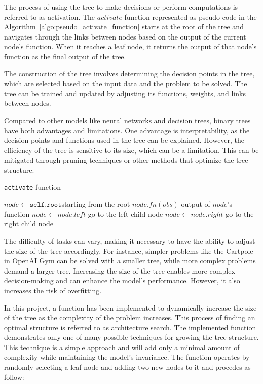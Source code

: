 The process of using the tree to make decisions or perform computations is referred to as activation. The $activate$ function represented as pseudo code in the Algorithm~\ref{algo:pseudo_activate_function} starts at the root of the tree and navigates through the links between nodes based on the output of the current node's function. When it reaches a leaf node, it returns the output of that node's function as the final output of the tree.

The construction of the tree involves determining the decision points in the tree, which are selected based on the input data and the problem to be solved. The tree can be trained and updated by adjusting its functions, weights, and links between nodes.

Compared to other models like neural networks and decision trees, binary trees have both advantages and limitations. One advantage is interpretability, as the decision points and functions used in the tree can be explained. However, the efficiency of the tree is sensitive to its size, which can be a limitation. This can be mitigated through pruning techniques or other methods that optimize the tree structure.

\begin{algorithm}
\caption{\texttt{activate} function}
\label{algo:pseudo_activate_function}
\begin{algorithmic}[1]
\State $node \gets \texttt{self.root}$\Comment starting from the root 
    \Return $node.fn(obs)$ \Comment output of $node$'s function
    \State $node \gets node.left$ \Comment go to the left child node
\Else 
    \State $node \gets node.right$ \Comment go to the right child node
\EndIf
\EndWhile
\EndFunction
\end{algorithmic}
\end{algorithm}

The difficulty of tasks can vary, making it necessary to have the ability to adjust the size of the tree accordingly. For instance, simpler problems like the Cartpole in OpenAI Gym can be solved with a smaller tree, while more complex problems demand a larger tree. Increasing the size of the tree enables more complex decision-making and can enhance the model's performance. However, it also increases the risk of overfitting.

In this project, a function has been implemented to dynamically increase the size of the tree as the complexity of the problem increases. This process of finding an optimal structure is referred to as architecture search. The implemented function demonstrates only one of many possible techniques for growing the tree structure. This technique is a simple approach and will add only a minimal amount of complexity while maintaining the model's invariance. The function operates by randomly selecting a leaf node and adding two new nodes to it and procedes as follow:

